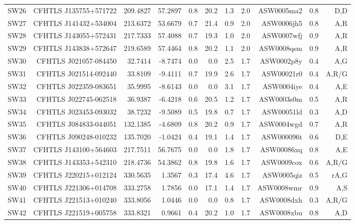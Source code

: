 \documentclass[useAMS,usenatbib,a4paper]{mn2e}
\begin{document}
\begin{center}
\begin{longtable}{lrrrrrrrrrr}
SW26 & CFHTLS J135755+571722 &  209.4827 &   57.2897 &  0.8 & 20.2 &  1.3 &  2.0 & ASW0005ma2 &  0.8  &  D,D   \\ 
SW27 & CFHTLS J141432+534004 &  213.6372 &   53.6679 &  0.7 & 21.4 &  0.9 &  2.0 & ASW0006jh5 &  0.8  &  A,R   \\ 
SW28 & CFHTLS J143055+572431 &  217.7333 &   57.4088 &  0.7 & 19.3 &  1.0 &  2.0 & ASW0007wfj &  0.9  &  A,R   \\ 
SW29 & CFHTLS J143838+572647 &  219.6589 &   57.4464 &  0.8 & 20.2 &  1.1 &  2.0 & ASW0008qsm &  0.9  &  A,R   \\ 
SW30 & CFHTLS J021057-084450 &   32.7414 &   -8.7474 &  0.0 &  0.0 &  2.5 &  1.7 & ASW0002p8y &  0.4  &  A,G   \\ 
SW31 & CFHTLS J021514-092440 &   33.8109 &   -9.4111 &  0.7 & 19.9 &  2.6 &  1.7 & ASW00021r0 &  0.4  &  A,R/G   \\ 
SW32 & CFHTLS J022359-083651 &   35.9995 &   -8.6143 &  0.0 &  0.0 &  3.1 &  1.7 & ASW0004iye &  0.4  &  A,E   \\ 
SW33 & CFHTLS J022745-062518 &   36.9387 &   -6.4218 &  0.6 & 20.5 &  1.2 &  1.7 & ASW0003s0m &  0.5  &  A,R   \\ 
SW34 & CFHTLS J023453-093032 &   38.7232 &   -9.5089 &  0.5 & 19.8 &  0.7 &  1.7 & ASW00051ld &  0.3  &  A,D   \\ 
SW35 & CFHTLS J084833-044051 &  132.1385 &   -4.6809 &  0.8 & 20.2 &  0.9 &  1.7 & ASW0004wgd &  0.7  &  A,R   \\ 
SW36 & CFHTLS J090248-010232 &  135.7020 &   -1.0424 &  0.4 & 19.1 &  1.4 &  1.7 & ASW000096t &  0.6  &  D,E   \\ 
SW37 & CFHTLS J143100+564603 &  217.7511 &   56.7675 &  0.0 &  0.0 &  1.8 &  1.7 & ASW00086xq &  0.8  &  A,E   \\ 
SW38 & CFHTLS J143353+542310 &  218.4736 &   54.3862 &  0.8 & 19.8 &  1.6 &  1.7 & ASW0009cox &  0.6  &  A,R/G   \\ 
SW39 & CFHTLS J220215+012124 &  330.5635 &    1.3567 &  0.3 & 17.4 &  4.6 &  1.7 & ASW0005qiz &  0.5  &  rA,G   \\ 
SW40 & CFHTLS J221306+014708 &  333.2758 &    1.7856 &  0.0 & 17.1 &  1.4 &  1.7 & ASW0008wmr &  0.9  &  A,S   \\ 
SW41 & CFHTLS J221513+010240 &  333.8056 &    1.0446 &  0.0 &  0.0 &  0.8 &  1.7 & ASW0008dxh &  0.3  &  A,R/G   \\ 
SW42 & CFHTLS J221519+005758 &  333.8321 &    0.9661 &  0.4 & 20.2 &  1.0 &  1.7 & ASW0008xbu &  0.8  &  A,D   \\ 

\end{longtable}
\end{center}
\end{document}
